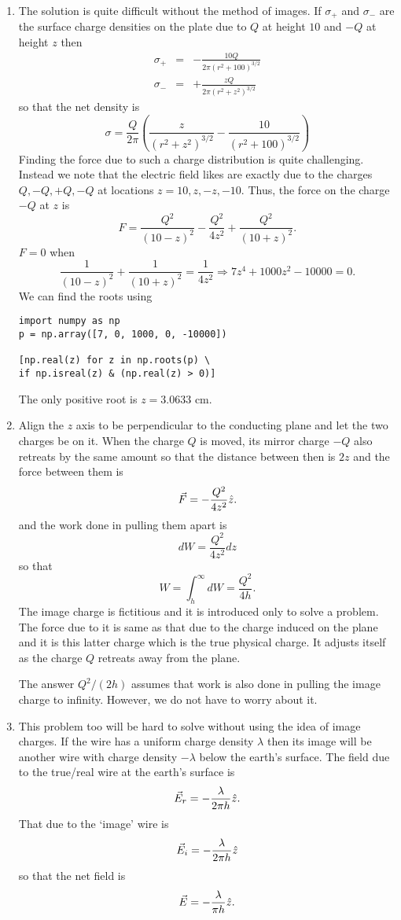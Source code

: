 \documentclass{article}
\begin{document}
\begin{enumerate}
\item The solution is quite difficult without the method of images. If $\sigma_+$
and $\sigma_-$ are the surface charge densities on the plate due to $Q$ at height
$10$ and $-Q$ at height $z$ then
\begin{eqnarray*}
\sigma_+ &=& -\frac{10Q}{2\pi(r^2 + 100)^{3/2}} \\
\sigma_- &=& +\frac{zQ}{2\pi(r^2 + z^2)^{3/2}}
\end{eqnarray*}
so that the net density is
\[
\sigma = \frac{Q}{2\pi}\left(\frac{z}{(r^2 + z^2)^{3/2}} - \frac{10}{(r^2 + 100)^{3/2}}\right)
\]
Finding the force due to such a charge distribution is quite challenging. Instead
we note that the electric field likes are exactly due to the charges $Q, -Q, +Q, -Q$
at locations $z = 10, z, -z, -10$. Thus, the force on the charge $-Q$ at $z$ is
\[
F = \frac{Q^2}{(10 - z)^2} - \frac{Q^2}{4z^2} + \frac{Q^2}{(10 + z)^2}.
\]
$F = 0$ when
\[
\frac{1}{(10 - z)^2} + \frac{1}{(10 + z)^2} = \frac{1}{4z^2}
\Rightarrow 7z^4 + 1000z^2 - 10000 = 0.
\]
We can find the roots using
\begin{verbatim}
import numpy as np
p = np.array([7, 0, 1000, 0, -10000])

[np.real(z) for z in np.roots(p) \ 
if np.isreal(z) & (np.real(z) > 0)]
\end{verbatim}
The only positive root is $z = 3.0633$ cm.

\item Align the $z$ axis to be perpendicular to the conducting plane and let the
two charges be on it. When the charge $Q$ is moved, its mirror charge $-Q$ also
retreats by the same amount so that the distance between then is $2z$ and the force
between them is
\[
\vec{F} = -\frac{Q^2}{4z^2}\hat{z}.
\]
and the work done in pulling them apart is
\[
dW = \frac{Q^2}{4z^2}dz
\]
so that
\[
W = \int_h^\infty dW = \frac{Q^2}{4h}.
\]
The image charge is fictitious and it is introduced only to solve a problem. The
force due to it is same as that due to the charge induced on the plane and it is
this latter charge which is the true physical charge. It adjusts itself as the 
charge $Q$ retreats away from the plane.

The answer $Q^2/(2h)$ assumes that work is also done in pulling the image charge
to infinity. However, we do not have to worry about it.

\item This problem too will be hard to solve without using the idea of image
charges. If the wire has a uniform charge density $\lambda$ then its image will
be another wire with charge density $-\lambda$ below the earth's surface. The 
field due to the true/real wire at the earth's surface is
\[
\vec{E}_r = -\frac{\lambda}{2\pi h}\hat{z}.
\]
That due to the `image' wire is
\[
\vec{E}_i = -\frac{\lambda}{2\pi h}\hat{z}
\]
so that the net field is
\[
\vec{E} = -\frac{\lambda}{\pi h}\hat{z}.
\]


\end{enumerate}
\end{document}
